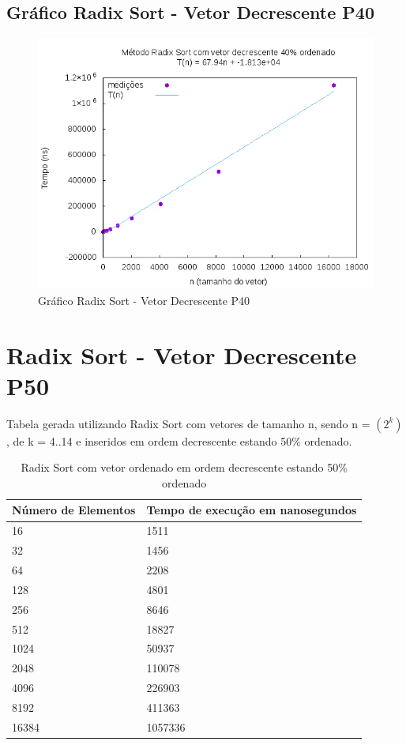 \documentclass[12pt,a4paper,twoside]{report}
\begin{document}
\subsection{Gráfico Radix Sort - Vetor Decrescente P40}
\begin{figure}[H]
    \centering
    \includegraphics[width=0.7\linewidth]{graficos/RadixSort/vIntDecrescenteP40/vIntDecrescenteP40.png}
  \caption{Gráfico Radix Sort - Vetor Decrescente P40}
\end{figure}

\section{Radix Sort - Vetor Decrescente P50}
Tabela gerada utilizando Radix Sort com vetores de tamanho n, sendo n = $(2^k)$, de k = 4..14 e inseridos em ordem decrescente estando 50\% ordenado.
\begin{table}[H]
\centering
\caption{Radix Sort com vetor ordenado em ordem decrescente estando 50\% ordenado}
\label{my-label}
\begin{tabular}{|l|l|}
\hline
\multicolumn{1}{|c|}{\textbf{Número de Elementos}} & \multicolumn{1}{c|}{\textbf{Tempo de execução em nanosegundos}} \\ \hline
16 & 1511 \\ \hline
32 & 1456 \\ \hline
64 & 2208 \\ \hline
128 & 4801 \\ \hline
256 & 8646 \\ \hline
512 & 18827 \\ \hline
1024 & 50937 \\ \hline
2048 & 110078 \\ \hline
4096 & 226903 \\ \hline
8192 & 411363 \\ \hline
16384 & 1057336 \\ \hline
\end{tabular}
\end{table}
\end{document}
